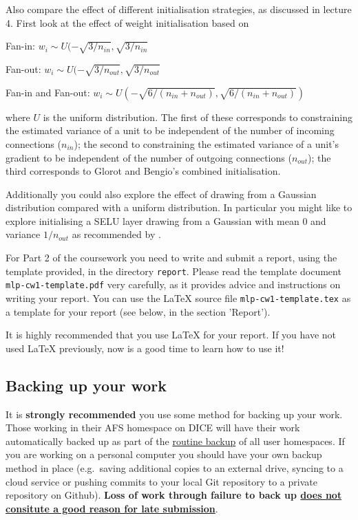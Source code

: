 \documentclass[11pt,]{article}
\begin{document}
Also compare the effect of different initialisation strategies, as discussed in lecture 4.  First look at the effect of weight initialisation based on
\begin{compactitem}
\item Fan-in: $w_i \sim U(-\sqrt{3/n_{in}}, \sqrt{3/n_{in}}$
\item Fan-out: $w_i \sim U(-\sqrt{3/n_{out}}, \sqrt{3/n_{out}}$
\item Fan-in and Fan-out: $w_i \sim U \left(-\sqrt{6/(n_{in}+n_{out})}, \sqrt{6/(n_{in}+n_{out})}\right)$
\end{compactitem}
where $U$ is the uniform distribution.   The first of these corresponds to constraining the estimated variance of a unit to be independent of the number of incoming connections ($n_{in}$);  the second to  constraining the estimated variance of a unit's gradient to be independent of the number of outgoing connections ($n_{out}$);  the third corresponds to Glorot and Bengio's combined initialisation.  

Additionally you could also explore the effect of drawing from a Gaussian distribution compared with a uniform distribution.  In particular you might like to explore initialising a SELU layer drawing from a Gaussian with mean 0 and variance $1/n_{out}$ as recommended by \cite{klambauer2017self}.

For Part 2 of the coursework you need to write and submit a report, using the template provided, in the directory \verb+report+.  Please read the template document \verb+mlp-cw1-template.pdf+ very carefully, as it provides advice and instructions on writing your report.  You can use the LaTeX source file \verb+mlp-cw1-template.tex+ as a template for your report (see below, in the section 'Report').

It is highly recommended that you use LaTeX for your report.  If you have not used LaTeX previously, now is a good time to learn how to use it!

\subsection{Backing up your work}
\label{sec:backing-up-your-work}

It is \textbf{strongly recommended} you use some method for backing up
your work. Those working in their AFS homespace on DICE will have their
work automatically backed up as part of the
\href{http://computing.help.inf.ed.ac.uk/backups-and-mirrors}{routine
backup} of all user homespaces. If you are working on a personal
computer you should have your own backup method in place (e.g.~saving
additional copies to an external drive, syncing to a cloud service or
pushing commits to your local Git repository to a private repository on
Github). \textbf{Loss of work through failure to back up
\href{http://tinyurl.com/edinflate}{does not consitute a good reason for
late submission}}.
\end{document}
